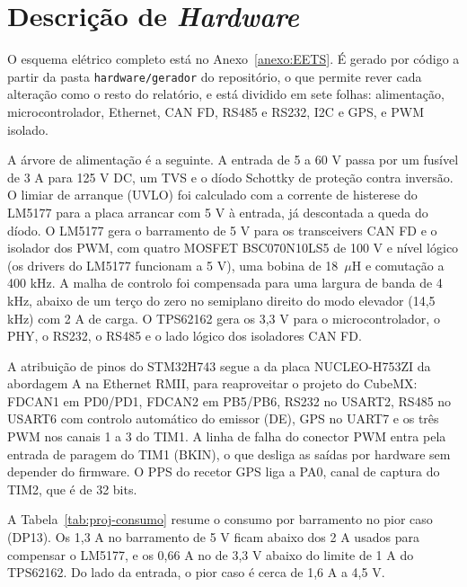 \section{Descrição de \textit{Hardware}}
\label{sec:proj-hardware}

O esquema elétrico completo está no Anexo~\ref{anexo:EETS}. É gerado por
código a partir da pasta \texttt{hardware/gerador} do repositório, o que
permite rever cada alteração como o resto do relatório, e está dividido em
sete folhas: alimentação, microcontrolador, Ethernet, CAN FD, RS485 e RS232,
I2C e GPS, e PWM isolado.

A árvore de alimentação é a seguinte. A entrada de 5 a 60 V passa por um
fusível de 3 A para 125 V DC, um TVS e o díodo Schottky de proteção contra
inversão. O limiar de arranque (UVLO) foi calculado com a corrente de histerese
do LM5177 para a placa arrancar com 5 V à entrada, já descontada a queda do díodo.
O LM5177 gera o barramento de 5 V para os transceivers CAN FD e o isolador
dos PWM, com quatro MOSFET BSC070N10LS5 de 100 V e nível lógico (os drivers do LM5177
funcionam a 5 V), uma bobina de 18~$\mu$H
e comutação a 400 kHz. A malha de controlo foi compensada para uma largura
de banda de 4 kHz, abaixo de um terço do zero no semiplano direito do modo
elevador (14,5 kHz) com 2 A de carga. O TPS62162 gera os 3,3 V para o
microcontrolador, o PHY, o RS232, o RS485 e o lado lógico dos isoladores
CAN FD.

A atribuição de pinos do STM32H743 segue a da placa NUCLEO-H753ZI da
abordagem A na Ethernet RMII, para reaproveitar o projeto do CubeMX: FDCAN1 em PD0/PD1,
FDCAN2 em PB5/PB6, RS232 no USART2, RS485 no USART6 com controlo automático
do emissor (DE), GPS no UART7 e os três PWM nos canais 1 a 3 do TIM1. A
linha de falha do conector PWM entra pela entrada de paragem do TIM1
(BKIN), o que desliga as saídas por hardware sem depender do firmware. O
PPS do recetor GPS liga a PA0, canal de captura do TIM2, que é de 32 bits.

A Tabela~\ref{tab:proj-consumo} resume o consumo por barramento no pior
caso (DP13). Os 1,3 A no barramento de 5 V ficam abaixo dos 2 A usados para
compensar o LM5177, e os 0,66 A no de 3,3 V abaixo do limite de 1 A do
TPS62162. Do lado da entrada, o pior caso é cerca de 1,6 A a 4,5 V.

